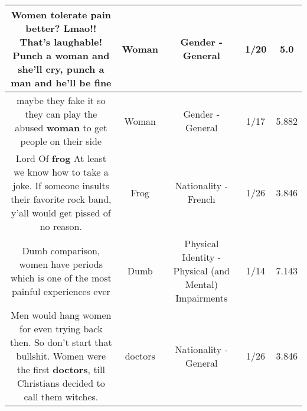 \documentclass[11pt]{article}
\newlength\mylength
\begin{document}
\begin{center}
\begin{longtable}{|C{.65\mylength}|C{.30\mylength}|C{.12\mylength}|C{.12\mylength}|C{.12\mylength}|}
  \small Women tolerate pain better? Lmao!! That's laughable! Punch a \textbf{woman} and she'll cry, punch a man and he'll be fine\normalsize   & Woman & Gender - General & 1/20 & 5.0 \\  \hline
  \small maybe they fake it so they can play the abused \textbf{woman} to get people on their side\normalsize   & Woman & Gender - General & 1/17 & 5.882 \\  \hline
  \small Lord Of \textbf{frog} At least we know how to take a joke. If someone  insults their favorite rock band, y'all would get pissed of no reason.\normalsize   & Frog & Nationality - French & 1/26 & 3.846 \\  \hline
  \small Dumb comparison, women have periods which is one of the most painful experiences ever\normalsize   & Dumb & Physical Identity - Physical (and Mental) Impairments & 1/14 & 7.143 \\  \hline
  \small Men would hang women for even trying back then. So don't start that bullshit. Women were the first \textbf{doctors}, till Christians decided to call them witches.\normalsize   & doctors & Nationality - General & 1/26 & 3.846 \\  \hline

\end{longtable}
\end{center}
\end{document}
